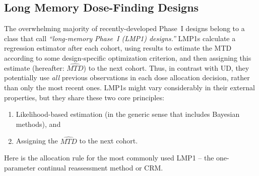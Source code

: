 \subsection{Long Memory Dose-Finding Designs}

The overwhelming majority of recently-developed Phase~I designs belong to a class that \cite{Oron:Hoff:smal:2013} call \emph{``long-memory Phase~I (LMP1) designs.''} LMP1s calculate a regression estimator after each cohort, using results to estimate the MTD according to some design-specific optimization criterion, and then assigning this estimate (hereafter: $\widehat{MTD}$) to the next cohort. Thus, in contrast with UD, they potentially use \emph{all} previous observations in each dose allocation decision, rather than only the most recent ones. LMP1s might vary considerably in their external properties, but they share these two core principles:
\begin{enumerate}
\item Likelihood-based estimation (in the generic sense that includes Bayesian methods), and
\item Assigning the $\widehat{MTD}$ to the next cohort.
\end{enumerate}

Here is the allocation rule for the most commonly used LMP1 -- the one-parameter continual reassessment method or CRM.

